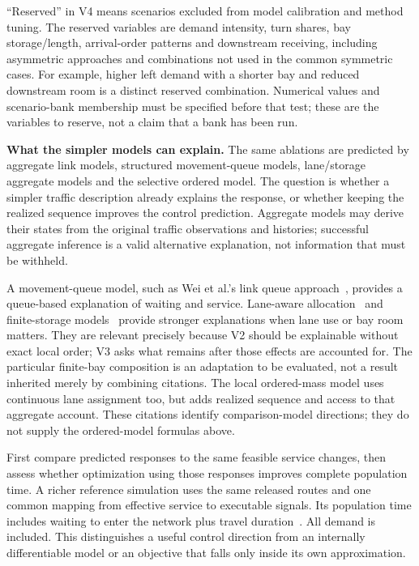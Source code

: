 \documentclass[10pt,a4paper]{article}
\begin{document}
``Reserved'' in V4 means scenarios excluded from model calibration and
method tuning. The reserved variables are demand intensity, turn shares,
bay storage/length, arrival-order patterns and downstream receiving,
including asymmetric approaches and combinations not used in the common
symmetric cases. For example, higher left demand with a shorter bay and
reduced downstream room is a distinct reserved combination. Numerical
values and scenario-bank membership must be specified before that test;
these are the variables to reserve, not a claim that a bank has been run.

\textbf{What the simpler models can explain.} The same ablations are
predicted by aggregate link models, structured movement-queue models,
lane/storage aggregate models and the selective ordered model. The
question is whether a simpler traffic description already explains the
response, or whether keeping the realized sequence improves the control
prediction. Aggregate models may derive their states from the original
traffic observations and histories; successful aggregate inference is a
valid alternative explanation, not information that must be withheld.

A movement-queue model, such as Wei et al.'s link queue approach~\cite{wei},
provides a queue-based explanation of waiting and service. Lane-aware
allocation~\cite{gong} and finite-storage models~\cite{liu} provide
stronger explanations when lane use or bay room matters. They are relevant
precisely because V2 should be explainable without exact local order;
V3 asks what remains after those effects are accounted for. The particular
finite-bay composition is an adaptation to be evaluated, not a result
inherited merely by combining citations. The local ordered-mass model
uses continuous lane assignment too, but adds realized sequence and
access to that aggregate account.
These citations identify comparison-model directions; they do not supply the ordered-model formulas above.

First compare predicted responses to the same feasible service changes,
then assess whether optimization using those responses improves complete
population time. A richer reference simulation uses the same released
routes and one common mapping from effective service to executable
signals. Its population time includes waiting to enter the network plus
travel duration~\cite{sumo}. All demand is included. This distinguishes
a useful control direction from an internally differentiable model or
an objective that falls only inside its own approximation.
\par
\end{document}
